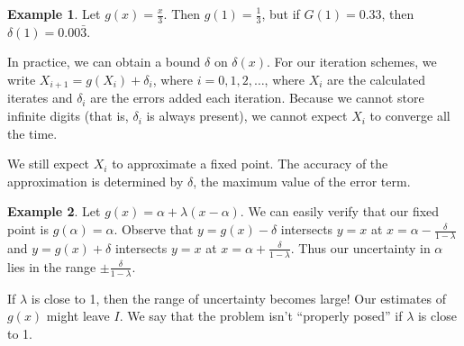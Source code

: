 \documentclass[12pt,letterpaper,DIV=11]{scrartcl}
\theoremstyle{plain}
\theoremstyle{definition}
\newtheorem{example}{Example}[section]
\theoremstyle{remark}
\begin{document}
\begin{example}
  Let $g(x) = \frac{x}{3}$.
  Then $g(1) = \frac{1}{3}$, but if $G(1) = 0.33$, then $\delta(1) = 0.00\bar{3}$.
\end{example}
In practice, we can obtain a bound $\delta$ on $\delta(x)$.
For our iteration schemes, we write $X_{i + 1} = g(X_i) + \delta_i$, where $i = 0, 1, 2, \dots$,
where $X_i$ are the calculated iterates and $\delta_i$ are the errors added each iteration.
Because we cannot store infinite digits (that is, $\delta_i$ is always present), we cannot expect $X_i$ to converge all the time.

We still expect $X_i$ to approximate a fixed point.
The accuracy of the approximation is determined by $\delta$, the maximum value of the error term.

\begin{example}
  Let $g(x) = \alpha + \lambda (x - \alpha)$.
  We can easily verify that our fixed point is $g(\alpha) = \alpha$.
  Observe that $y = g(x) - \delta$ intersects $y = x$ at $x = \alpha - \frac{\delta}{1 - \lambda}$ and $y = g(x) + \delta$ intersects $y = x$ at $x = \alpha + \frac{\delta}{1 - \lambda}$.
  Thus our uncertainty in $\alpha$ lies in the range $\pm \frac{\delta}{1 - \lambda}$.

  If $\lambda$ is close to 1, then the range of uncertainty becomes large!
  Our estimates of $g(x)$ might leave $I$.
  We say that the problem isn't \enquote{properly posed} if $\lambda$ is close to 1.
\end{example}
\end{document}
